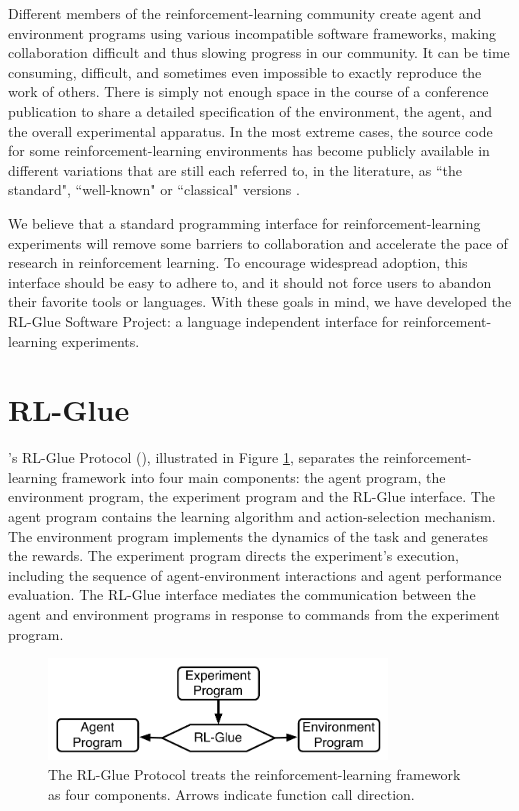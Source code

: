 \documentclass[twoside,11pt]{article}
\begin{document}
Different members of the reinforcement-learning community create agent and environment programs using various incompatible software frameworks, making collaboration difficult and thus slowing progress in our community. It  can be time consuming, difficult, and sometimes even impossible to exactly reproduce the work of others.  There is simply not enough space in the course of a conference publication to share a detailed specification of the environment, the agent, and the overall experimental apparatus.
In the most extreme cases, the source code for some reinforcement-learning environments has become publicly available in different variations that are still each referred to, in the literature, as ``the standard", ``well-known" or ``classical"  versions \citep{whiteThesis}.

We believe that a standard programming interface for reinforcement-learning experiments will remove some barriers to collaboration and accelerate the pace of research in reinforcement learning.  To encourage widespread adoption, this interface should be easy to adhere to, and it should not force users to abandon their favorite tools or languages.  With these goals in mind, we have developed the RL-Glue Software Project: a language independent interface for reinforcement-learning experiments.





	 

\section{RL-Glue}

\citeauthor{whiteThesis}'s RL-Glue Protocol (\citeyear{whiteThesis}), illustrated in Figure \ref{fig:RLDIA}, separates the reinforcement-learning framework into four main components: the agent program, the environment program, the experiment program and the RL-Glue interface. The agent program contains the learning algorithm and action-selection mechanism. The environment program implements the dynamics of the task and generates the rewards. The experiment program directs the experiment's execution, including the sequence of agent-environment interactions and agent performance evaluation.  The RL-Glue interface mediates the communication between the agent and environment programs in response to commands from the experiment program. 

\begin{figure}[ht]
\begin{center}
\includegraphics[width=9cm]{glue.pdf}
\vspace{-0.2cm}
\caption{\small The RL-Glue Protocol treats the reinforcement-learning framework as four components.  Arrows indicate function call direction.}\label{fig:RLDIA}
\end{center}
\vspace{-0.4cm}
\end{figure}
\end{document}
